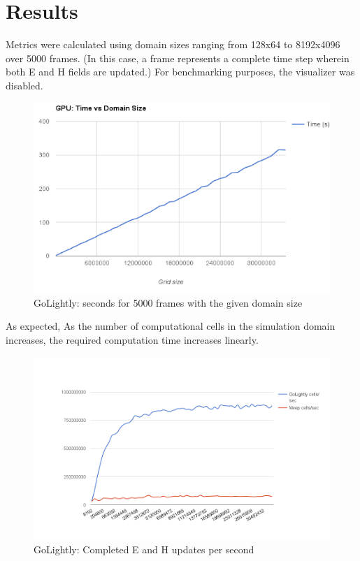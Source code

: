 \chapter{Results} \label{ch:conclusions}


Metrics were calculated using domain sizes ranging from 128x64 to 8192x4096 over 5000 frames. (In this case, a frame represents a complete time step wherein both E and H fields are updated.) For benchmarking purposes, the visualizer was disabled.

\begin{figure}[H]
	\centering
	\includegraphics[width=\textwidth,
	keepaspectratio]{gpu_time_vs_domain_size.png}
	\caption{GoLightly: seconds for 5000 frames with the given domain size}
	\label{fig:gpuTimeVsDomainSize}
\end{figure}

As expected, As the number of computational cells in the simulation domain increases, the required computation time increases linearly.

\begin{figure}[H]
	\centering
	\includegraphics[width=\textwidth,
	keepaspectratio]{cells-per-second.png}
	\caption{GoLightly: Completed E and H updates per second}
	\label{fig:gridSizeVsComputeTime}
\end{figure}

